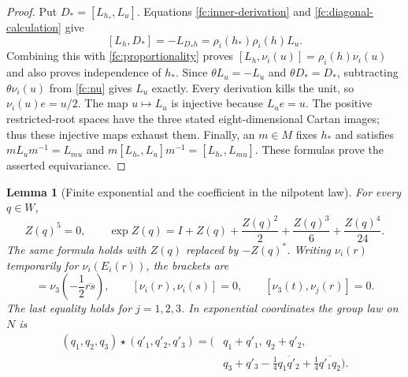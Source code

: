 \documentclass[11pt]{article}
\newtheorem{lemma}[theorem]{Lemma}
\theoremstyle{definition}
\begin{document}
\begin{proof}
Put $D_*=[L_{h_*},L_u]$. Equations
\eqref{fc:inner-derivation} and
\eqref{fc:diagonal-calculation} give
\[
 [L_h,D_*]=-L_{D_*h}=\rho_i(h_*)\rho_i(h)L_u.
\]
Combining this with \eqref{fc:proportionality} proves
$[L_h,\nu_i(u)]=\rho_i(h)\nu_i(u)$ and also proves independence of
$h_*$. Since $\theta L_u=-L_u$ and $\theta D_*=D_*$, subtracting
$\theta\nu_i(u)$ from \eqref{fc:nu} gives $L_u$ exactly.
Every derivation kills the unit, so $\nu_i(u)e=u/2$.
The map $u\mapsto L_u$ is injective because $L_ue=u$.
The positive restricted-root spaces have the three stated
eight-dimensional Cartan images; thus these injective maps exhaust
them. Finally, an $m\in M$ fixes $h_*$ and satisfies
$mL_um^{-1}=L_{mu}$ and
$m[L_{h_*},L_u]m^{-1}=[L_{h_*},L_{mu}]$.
These formulas prove the asserted equivariance.
\end{proof}

\begin{lemma}[Finite exponential and the coefficient in the nilpotent law]
\label{fc:finite-exponential}
For every $q\in W$,
\begin{equation}
 Z(q)^5=0,\qquad
 \exp Z(q)=I+Z(q)+\frac{Z(q)^2}{2}
                   +\frac{Z(q)^3}{6}+\frac{Z(q)^4}{24}.
 \label{fc:finite-exp}
\end{equation}
The same formula holds with $Z(q)$ replaced by $-Z(q)^*$.
Writing $\nu_i(r)$ temporarily for $\nu_i(E_i(r))$, the brackets are
\begin{equation}
 [\nu_1(r),\nu_2(s)]=\nu_3\left(-\frac12\overline{rs}\right),
 \qquad [\nu_i(r),\nu_i(s)]=0,
 \qquad[\nu_3(t),\nu_j(r)]=0.
 \label{fc:nil-bracket}
\end{equation}
The last equality holds for $j=1,2,3$. In exponential coordinates the
group law on $N$ is
\begin{equation}
 \begin{split}
 (q_1,q_2,q_3)\star(q'_1,q'_2,q'_3)
 =\biggl(&q_1+q'_1,\ q_2+q'_2,\\
         &q_3+q'_3-\frac14\overline{q_1q'_2}
                         +\frac14\overline{q'_1q_2}\biggr).
 \end{split}
 \label{fc:nil-group-law}
\end{equation}
\end{lemma}
\end{document}
